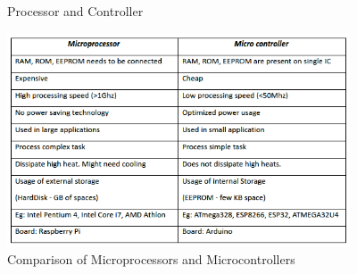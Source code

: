 \begin{figure}[htp]
  \centering
  \label{figure}
  \caption{Processor and Controller}
\end{figure}
\begin{figure}
    \centering
    \includegraphics[width=4in]{Chapters/images/ardtab2.png}
    \caption{Comparison of Microprocessors and Microcontrollers}
    \label{fig:my_label}
\end{figure}


